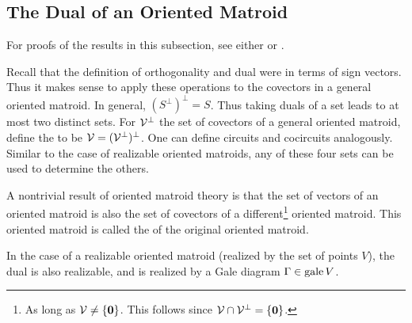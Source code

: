     \subsection{The Dual of an Oriented Matroid}
        For proofs of the results in this subsection, see either \cite{ZieglerBook} or \cite{OrientedMatBook}.

        Recall that the definition of orthogonality and dual were in terms of sign vectors.  Thus it makes sense to apply these operations to the covectors in a general oriented matroid.  In general, \((S^\perp)^\perp=S\).  Thus taking duals of a set leads to at most two distinct sets.  For \(\mathcal{V}^\perp\) the set of covectors of a general oriented matroid, define the  to be \(\mathcal{V}=(\mathcal{V}^\perp)^\perp\).  One can define circuits and cocircuits analogously.  Similar to the case of realizable oriented matroids, any of these four sets can be used to determine the others.

        A nontrivial result of oriented matroid theory is that the set of vectors of an oriented matroid is also the set of covectors of a different\footnote{As long as \(\mathcal{V}\ne\left\{\bm{0}\right\}\).  This follows since \(\mathcal{V}\cap\mathcal{V}^\perp=\left\{\bm{0}\right\}\).} oriented matroid.  This oriented matroid is called the  of the original oriented matroid.

        In the case of a realizable oriented matroid (realized by the set of points \(V\)), the dual is also realizable, and is realized by a Gale diagram \(\Gamma\in\operatorname{gale} V\). 